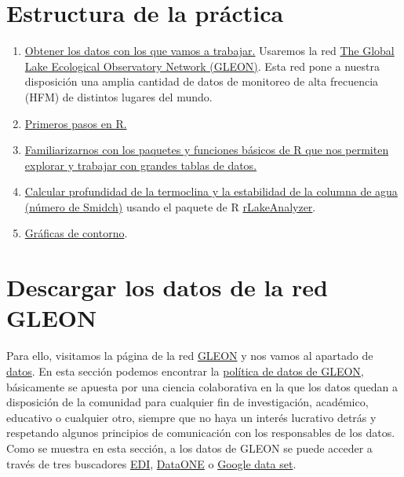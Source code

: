 \documentclass[
]{book}
\providecommand{\tightlist}{%
  \setlength{\itemsep}{0pt}\setlength{\parskip}{0pt}}
\begin{document}
\hypertarget{estructura-de-la-pruxe1ctica}{%
\chapter{Estructura de la práctica}\label{estructura-de-la-pruxe1ctica}}

\begin{enumerate}
\def\labelenumi{\arabic{enumi}.}
\tightlist
\item
  \protect\hyperlink{Descarga}{Obtener los datos con los que vamos a trabajar.} Usaremos la red \href{https://gleon.org/}{The Global Lake Ecological Observatory Network (GLEON)}. Esta red pone a nuestra disposición una amplia cantidad de datos de monitoreo de alta frecuencia (HFM) de distintos lugares del mundo.
\item
  \protect\hyperlink{PrimerosPasos}{Primeros pasos en R.}
\item
  \href{@Tidyverse}{Familiarizarnos con los paquetes y funciones básicos de R que nos permiten explorar y trabajar con grandes tablas de datos.}
\item
  \href{@Termoclina}{Calcular profundidad de la termoclina y la estabilidad de la columna de agua (número de Smidch)} usando el paquete de R \href{https://cran.r-project.org/web/packages/rLakeAnalyzer/rLakeAnalyzer.pdf}{rLakeAnalyzer}.
\item
  \protect\hyperlink{Contour}{Gráficas de contorno}.
\end{enumerate}

\hypertarget{Descarga}{%
\chapter{Descargar los datos de la red GLEON}\label{Descarga}}

Para ello, visitamos la página de la red \href{https://gleon.org/}{GLEON} y nos vamos al apartado de \href{https://gleon.org/data}{datos}. En esta sección podemos encontrar la \href{https://gleon.org/sites/default/files/pdf/data/2009_October_15_GLEON_data_access_policy.pdf}{política de datos de GLEON}, básicamente se apuesta por una ciencia colaborativa en la que los datos quedan a disposición de la comunidad para cualquier fin de investigación, académico, educativo o cualquier otro, siempre que no haya un interés lucrativo detrás y respetando algunos principios de comunicación con los responsables de los datos. Como se muestra en esta sección, a los datos de GLEON se puede acceder a través de tres buscadores \href{https://portal.edirepository.org/nis/home.jsp}{EDI}, \href{https://search.dataone.org/data}{DataONE} o \href{https://datasetsearch.research.google.com/}{Google data set}.
\end{document}
